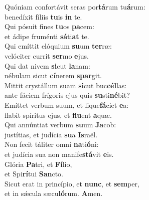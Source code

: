 \evenverse Quóniam confortávit seras por\textbf{tá}rum tu\textbf{á}rum:~\*\\
\evenverse benedíxit fíliis \textbf{tu}is \textbf{in} te.\\
\oddverse Qui pósuit fines \textbf{tu}os \textbf{pa}cem:~\*\\
\oddverse et ádipe fruménti \textbf{sá}ti\textbf{at} te.\\
\evenverse Qui emíttit elóquium \textbf{su}um \textbf{ter}ræ:~\*\\
\evenverse velóciter currit \textbf{ser}mo \textbf{e}jus.\\
\oddverse Qui dat nivem \textbf{si}cut \textbf{la}nam:~\*\\
\oddverse nébulam sicut \textbf{cí}nerem \textbf{spar}git.\\
\evenverse Mittit crystállum suam \textbf{si}cut buc\textbf{cél}las:~\*\\
\evenverse ante fáciem frígoris ejus quis \textbf{su}sti\textbf{né}bit?\\
\oddverse Emíttet verbum suum, et lique\textbf{fá}ciet \textbf{e}a:~\*\\
\oddverse flabit spíritus ejus, et \textbf{flu}ent \textbf{a}quæ.\\
\evenverse Qui annúntiat verbum \textbf{su}um \textbf{Ja}cob:~\*\\
\evenverse justítias, et judícia \textbf{su}a \textbf{Is}raël.\\
\oddverse Non fecit táliter omni \textbf{na}ti\textbf{ó}ni:~\*\\
\oddverse et judícia sua non manife\textbf{stá}vit \textbf{e}is.\\
\evenverse Glória \textbf{Pa}tri, et \textbf{Fí}lio,~\*\\
\evenverse et Spi\textbf{rí}tui \textbf{San}cto.\\
\oddverse Sicut erat in princípio, et \textbf{nunc}, et \textbf{sem}per,~\*\\
\oddverse et in sǽcula sæcu\textbf{ló}rum. \textbf{A}men.\\
